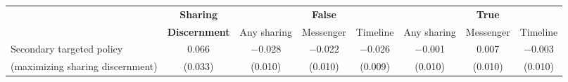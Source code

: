 
\begin{tabular}[t]{lccccccc}
 & \textbf{Sharing} &  & \textbf{False} &  &  & \textbf{True} & \\
 & \textbf{Discernment} & Any sharing & Messenger & Timeline & Any sharing & Messenger & Timeline\\\cmidrule(lr){2-2} \cmidrule(lr){3-5} \cmidrule(lr){6-8}
\hspace{1em}Secondary targeted policy & \num{0.066} & \num{-0.028} & \num{-0.022} & \num{-0.026} & \num{-0.001} & \num{0.007} & \num{-0.003}\\
 \hspace{1.5em}(maximizing sharing discernment) & (\num{0.033}) & (\num{0.010}) & (\num{0.010}) & (\num{0.009}) & (\num{0.010}) & (\num{0.010}) & (\num{0.010})\\
\end{tabular}

